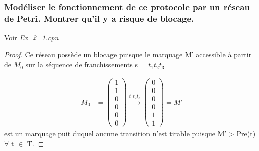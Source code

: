 \documentclass[french]{article}
\begin{document}
\subsubsection{Modéliser le fonctionnement de ce protocole par un réseau de Petri. Montrer qu’il y a risque de 
blocage.}
Voir \textit{Ex\_2\_1.cpn}
\begin{proof}
Ce réseau possède un blocage puisque le marquage M' accessible à partir de $M_0$ sur la séquence de franchissements s = $t_1 
t_2 t_3$

\begin{align*}
M_0 &= \begin{pmatrix} 
	1 \\ 
	1 \\ 
	0 \\
	0 \\
	0 \\
	0   
\end{pmatrix} \xrightarrow{t_1 t_2 t_3} 
\begin{pmatrix} 
	0 \\ 
	0 \\ 
	0 \\
	0 \\
	1 \\
	1   
\end{pmatrix} = M'
\end{align*}
est un marquage puit duquel aucune transition n'est tirable puisque M' > Pre(t) $\forall$ t $\in$ T.
\end{proof}
\end{document}
